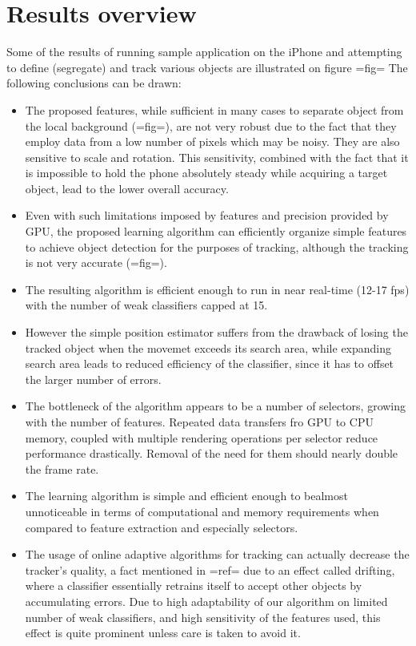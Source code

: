 \section{Results overview}
Some of the results of running sample application on the iPhone and attempting to define (segregate) and track various objects are illustrated on figure {{=fig=}}
The following conclusions can be drawn:
\begin{itemize}
\item The proposed features, while sufficient in many cases to separate object from the local background ({{=fig=}}), are not very robust due to the fact that they employ data from a low  number of pixels which may be noisy. They are also sensitive to scale and rotation. This sensitivity, combined with the fact that it is impossible to hold the phone absolutely steady while acquiring a target object, lead to the lower overall accuracy. 
\item Even with such limitations imposed by features and precision provided by GPU, the proposed learning algorithm can efficiently organize simple features to achieve object detection for the purposes of tracking, although the tracking is not very accurate ({{=fig=}}).  
\item The resulting algorithm is efficient enough to run in near real-time (12-17 fps) with the number of weak classifiers capped at 15.
\item However the simple position estimator suffers from the drawback of losing the tracked object when the movemet exceeds its search area, while expanding search area leads to reduced efficiency of the classifier, since it has to offset the larger number of errors. 
\item The bottleneck of the algorithm appears to be a number of selectors, growing with the number of features. Repeated data transfers fro GPU to CPU memory, coupled with multiple rendering operations per selector reduce performance drastically. Removal of the need for them should nearly double the frame rate.
\item The learning algorithm is simple and efficient enough to bealmost unnoticeable in terms of computational and memory requirements when compared to feature extraction and especially selectors.
\item The usage of online adaptive algorithms for tracking can actually decrease the tracker's quality, a fact mentioned in {{=ref=}} due to an effect called drifting, where a classifier essentially retrains itself to accept other objects by accumulating errors. Due to high adaptability of our algorithm on limited number of weak classifiers, and high sensitivity of the features used, this effect is quite prominent unless care is taken to avoid it. 
\end{itemize}

